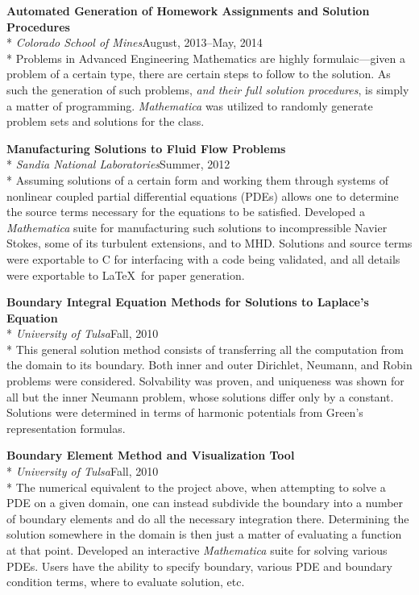 \documentclass[margin,line,pifont,palatino,10pt]{res}
\begin{document}
\begin{resume}
{\bf Automated Generation of Homework Assignments and Solution Procedures}\\*
{\it Colorado School of Mines}\hfill August, 2013--May, 2014\\*
Problems in Advanced Engineering Mathematics are highly formulaic---given a problem of a certain type, there are certain steps to follow to the solution.  As such the generation of such problems, \emph{and their full solution procedures}, is simply a matter of programming.  \emph{Mathematica} was utilized to randomly generate problem sets and solutions for the class.

{\bf Manufacturing Solutions to Fluid Flow Problems}\\*
{\it Sandia National Laboratories}\hfill Summer, 2012\\*
Assuming solutions of a certain form and working them through systems of nonlinear coupled partial differential equations (PDEs) allows one to determine the source terms necessary for the equations to be satisfied.  Developed a \emph{Mathematica} suite for manufacturing such solutions to incompressible Navier Stokes, some of its turbulent extensions, and to MHD.  Solutions and source terms were exportable to C for interfacing with a code being validated, and all details were exportable to \LaTeX\ for paper generation.

{\bf Boundary Integral Equation Methods for Solutions to Laplace's Equation}\\*
{\it University of Tulsa}\hfill Fall, 2010\\*
This general solution method consists of transferring all the computation from the domain to its boundary.  Both inner and outer Dirichlet, Neumann, and Robin problems were considered.  Solvability was proven, and uniqueness was shown for all but the inner Neumann problem, whose solutions differ only by a constant.  Solutions were determined in terms of harmonic potentials from Green's representation formulas.

{\bf Boundary Element Method and Visualization Tool}\\*
{\it University of Tulsa}\hfill Fall, 2010\\*
The numerical equivalent to the project above, when attempting to solve a PDE on a given domain, one can instead subdivide the boundary into a number of boundary elements and do all the necessary integration there.  Determining the solution somewhere in the domain is then just a matter of evaluating a function at that point.  Developed an interactive \emph{Mathematica} suite for solving various PDEs.  Users have the ability to specify boundary, various PDE and boundary condition terms, where to evaluate solution, etc.


\end{resume}
\end{document}
